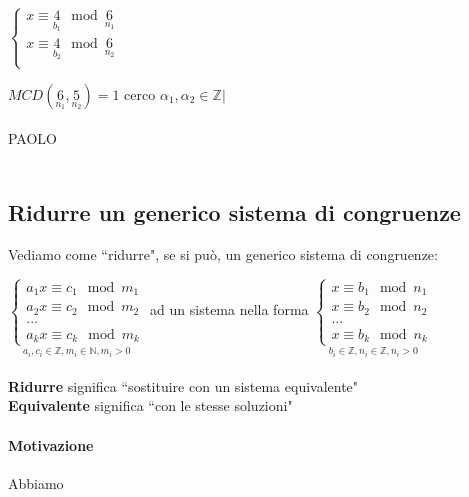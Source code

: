 $
\begin{cases}
    x\equiv\underset{b_1}{4}\mod \underset{n_1}{6}\\
    x\equiv\underset{b_2}{4}\mod \underset{n_2}{6}\\
\end{cases}
$

$MCD(\underset{n_1}{6},\underset{n_2}{5})=1$ cerco $\alpha_1,\alpha_2\in\mathbb{Z}|$
{\color{purple} \\\\PAOLO\\\\}

\subsection{Ridurre un generico sistema di congruenze}
Vediamo come ``ridurre", se si può, un generico sistema di congruenze:

    $\underset{a_i, c_i \in\mathbb{Z}, m_i\in\mathbb{N}, m_i>0}
    {\begin{cases}
        a_1x\equiv c_1\mod m_1\\
        a_2x\equiv c_2\mod m_2\\
        ...\\
        a_kx\equiv c_k\mod m_k
    \end{cases}}$
ad un sistema nella forma 
$
\underset{b_i\in\mathbb{Z}, n_i\in\mathbb{Z}, n_i>0}
{\begin{cases}
    x\equiv b_1\mod n_1\\
    x\equiv b_2\mod n_2\\
    ...\\
    x\equiv b_k\mod n_k
\end{cases}}
$\\\\
\textbf{Ridurre} significa ``sostituire con un sistema equivalente"\\
\textbf{Equivalente} significa ``con le stesse soluzioni" 


\paragraph{Motivazione} Abbiamo\\

